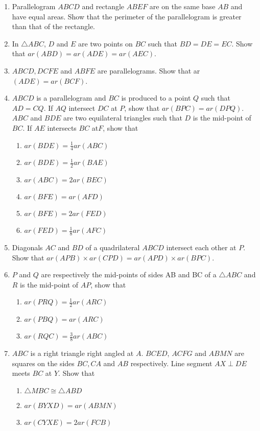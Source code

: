 \begin{enumerate}[label=\thesection.\arabic*.,ref=\thesection.\theenumi]
\item Parallelogram $ABCD$ and rectangle $ABEF$ are on the same base $AB$ and have equal areas. Show that the perimeter of the parallelogram is greater than that of the rectangle.
\item  In $\triangle ABC$,  $D$ and $E$ are two points on $BC$ such that $BD = DE = EC$. Show that $ar (ABD) = ar (ADE) = ar (AEC)$.
\item $ABCD, DCFE$ and $ABFE$ are parallelograms. Show that ar$ (ADE) = ar (BCF)$.
\item  $ABCD$ is a parallelogram and $BC$ is produced to a point $Q$ such that $AD = CQ$. If $AQ$ intersect $DC$ at $P$, show that $ar (BPC) = ar (DPQ)$.
$ABC$ and $BDE$ are two equilateral triangles such that $D$ is the mid-point of $BC$. If $AE$ intersects $BC$ at$ F$, show that 
\begin{enumerate}
\item $ar (BDE) = \frac{1}{ 4} ar (ABC)$
\item $ar (BDE) = \frac{1}{ 2} ar (BAE)$
\item $ar (ABC) = 2 ar (BEC)$
 \item $ar (BFE) = ar (AFD)$ 
\item $ar (BFE) = 2 ar (FED)$
\item $ar (FED) =
\frac{1}{ 8}
ar (AFC)$
\end{enumerate}
\item Diagonals $AC$ and $BD$ of a quadrilateral $ABCD$ intersect each other at $P$. Show that $ar (APB)  \times  ar (CPD) = ar (APD)  \times  ar (BPC)$.
\item  $P$ and $Q$ are respectively the mid-points of sides AB and BC of a $\triangle ABC$ and $R$ is the mid-point of $AP$, show that 
\begin{enumerate}
\item $ar (PRQ) = \frac{1 }{2}ar (ARC) $
\item $ar (PBQ) = ar (ARC)$
\item $ar (RQC) =
\frac{3}{ 8}
ar (ABC)$
\end{enumerate}
%
\item $ABC$ is a right triangle right angled at $A$. $BCED$, $ACFG$ and $ABMN$ are
squares on the sides $BC, CA$ and $AB$ respectively. Line segment $AX \perp  DE$ meets $BC$ at $Y$. Show that 
\begin{enumerate}
\item $ \triangle  MBC \cong  \triangle  ABD$
\item $ar (BYXD) = ar (ABMN)$ \item $ar (CYXE) = 2 ar (FCB)$

\end{enumerate}
\end{enumerate}

